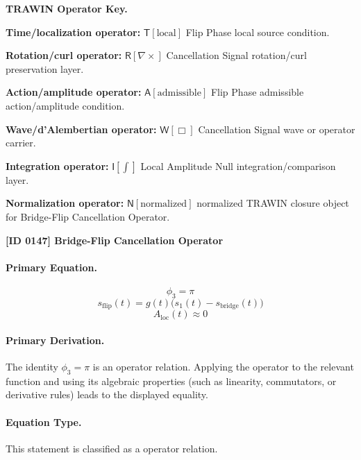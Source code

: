\par\vspace{0.45\baselineskip}
\noindent\begin{minipage}[t]{\linewidth}
\begingroup
\small
\raggedright
\textbf{TRAWIN Operator Key.}\par
\noindent\textbf{Time/localization operator:} $\mathsf{T}\!\left[\mathrm{local}\right]$ Flip Phase local source condition.\par
\noindent\textbf{Rotation/curl operator:} $\mathsf{R}\!\left[\nabla\times\right]$ Cancellation Signal rotation/curl preservation layer.\par
\noindent\textbf{Action/amplitude operator:} $\mathsf{A}\!\left[\mathrm{admissible}\right]$ Flip Phase admissible action/amplitude condition.\par
\noindent\textbf{Wave/d'Alembertian operator:} $\mathsf{W}\!\left[\Box\right]$ Cancellation Signal wave or operator carrier.\par
\noindent\textbf{Integration operator:} $\mathsf{I}\!\left[\int\right]$ Local Amplitude Null integration/comparison layer.\par
\noindent\textbf{Normalization operator:} $\mathsf{N}\!\left[\mathrm{normalized}\right]$ normalized TRAWIN closure object for Bridge-Flip Cancellation Operator.\par
\endgroup
\end{minipage}

\clearpage
\noindent\textbf{[ID 0147] Bridge-Flip Cancellation Operator}\par
\vspace{0.35em}
\paragraph{Primary Equation.}
\[
\phi_3=\pi
\]
\[
s_{\mathrm{flip}}(t)=g(t)\bigl(s_1(t)-s_{\mathrm{bridge}}(t)\bigr)
\]
\[
A_{\mathrm{loc}}(t)\approx 0
\]

\paragraph{Primary Derivation.}
The identity \( \phi_3=\pi \) is an operator relation. Applying the operator to the relevant function and using its algebraic properties (such as linearity, commutators, or derivative rules) leads to the displayed equality.
\paragraph{Equation Type.}
This statement is classified as a operator relation.

